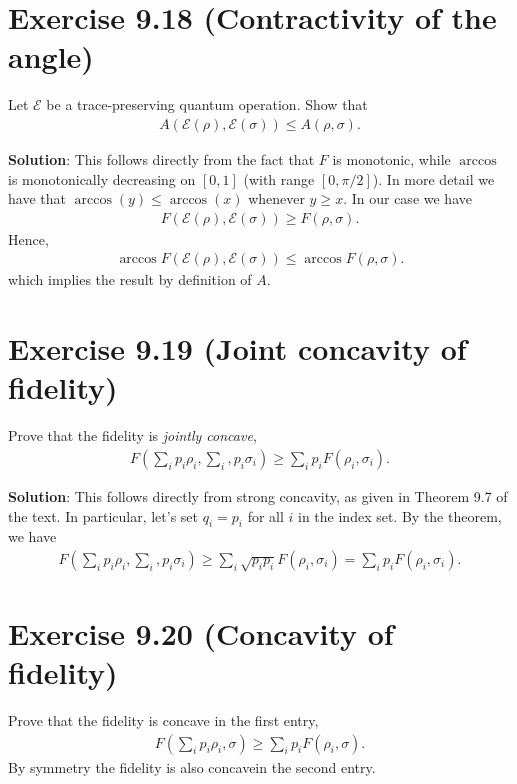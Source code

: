 \documentclass{book}
\newcommand{\mc}[1]{\mathcal{#1}}
\begin{document}
\section*{Exercise 9.18 (Contractivity of the angle)}
    Let $\mc{E}$ be a trace-preserving quantum operation. Show that
    \begin{align}
        A(\mc{E}(\rho), \mc{E}(\sigma)) \leq A(\rho, \sigma).
    \end{align}

    \textbf{Solution}: This follows directly from the fact that $F$ is monotonic, while $\arccos$ is monotonically decreasing on $[0,1]$ (with range $[0,\pi/2]$). In more detail we have that $\arccos(y) \leq \arccos(x)$ whenever $y \geq x$. In our case we have
    \begin{align}
        F(\mc{E}(\rho), \mc{E}(\sigma)) \geq F(\rho, \sigma).
    \end{align}
    Hence,
    \begin{align}
        \arccos F(\mc{E}(\rho), \mc{E}(\sigma)) \leq \arccos F(\rho, \sigma).
    \end{align}
    which implies the result by definition of $A$.

\section*{Exercise 9.19 (Joint concavity of fidelity)}
    Prove that the fidelity is \emph{jointly concave},
    \begin{align}
        F\left(\sum_i p_i \rho_i, \sum_i, p_i \sigma_i \right) \geq \sum_i p_i F(\rho_i, \sigma_i).
    \end{align}

    \textbf{Solution}: This follows directly from strong concavity, as given in Theorem 9.7 of the text. In particular, let's set $q_i = p_i$ for all $i$ in the index set. By the theorem, we have
    \begin{align}
        F\left(\sum_i p_i \rho_i, \sum_i, p_i \sigma_i \right) \geq \sum_i \sqrt{p_i p_i} F(\rho_i, \sigma_i) = \sum_i p_i F(\rho_i, \sigma_i).
    \end{align}

\section*{Exercise 9.20 (Concavity of fidelity)}
    Prove that the fidelity is concave in the first entry,
    \begin{align}
        F\left(\sum_i p_i \rho_i, \sigma\right) \geq \sum_i p_i F(\rho_i, \sigma).
    \end{align}
    By symmetry the fidelity is also concavein the second entry.
\end{document}
